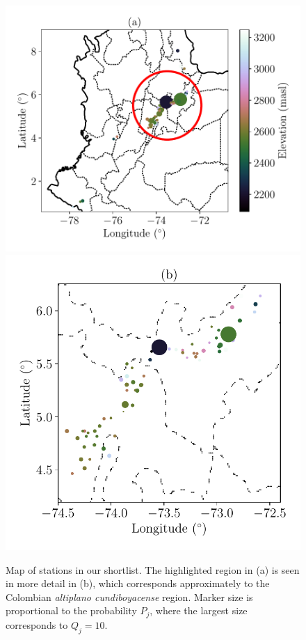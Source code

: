\documentclass[a4paper,fleqn,usenatbib]{mnras}
\begin{document}
\begin{figure}
\begin{center}
\includegraphics[scale=0.55]{slist.pdf}
\includegraphics[scale=0.55]{slistz.pdf}
\caption{Map of stations in our shortlist. The highlighted region in (a) is seen in more detail in (b), which corresponds approximately to the Colombian \emph{altiplano cundiboyacense} region. Marker size is proportional to the probability $P_j$, where the largest size corresponds to $Q_j=10$.}\label{shortlist}
\end{center}
\end{figure}
\end{document}
